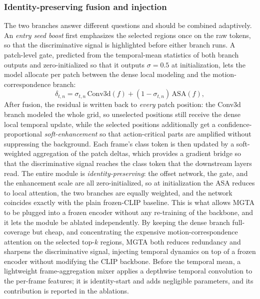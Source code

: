 \subsubsection{Identity-preserving fusion and injection}
The two branches answer different questions and should be combined adaptively. An \emph{entry seed boost} first emphasizes the selected regions once on the raw tokens, so that the discriminative signal is highlighted before either branch runs. A patch-level gate, predicted from the temporal-mean statistics of both branch outputs and zero-initialized so that it outputs $\sigma = 0.5$ at initialization, lets the model allocate per patch between the dense local modeling and the motion-correspondence branch:
\begin{equation}
  \delta_{t,n} = \sigma_{t,n} \, \mathrm{Conv3d}(f) + (1 - \sigma_{t,n}) \, \mathrm{ASA}(f),
  \label{eq:sata-fuse}
\end{equation}
After fusion, the residual is written back to \emph{every} patch position: the Conv3d branch modeled the whole grid, so unselected positions still receive the dense local temporal update, while the selected positions additionally get a confidence-proportional \emph{soft-enhancement} so that action-critical parts are amplified without suppressing the background. Each frame's class token is then updated by a soft-weighted aggregation of the patch deltas, which provides a gradient bridge so that the discriminative signal reaches the class token that the downstream layers read.
The entire module is \emph{identity-preserving}: the offset network, the gate, and the enhancement scale are all zero-initialized, so at initialization the ASA reduces to local attention, the two branches are equally weighted, and the network coincides exactly with the plain frozen-CLIP baseline. This is what allows MGTA to be plugged into a frozen encoder without any re-training of the backbone, and it lets the module be ablated independently. By keeping the dense branch full-coverage but cheap, and concentrating the expensive motion-correspondence attention on the selected top-$k$ regions, MGTA both reduces redundancy and sharpens the discriminative signal, injecting temporal dynamics on top of a frozen encoder without modifying the CLIP backbone.
Before the temporal mean, a lightweight frame-aggregation mixer applies a depthwise temporal convolution to the per-frame features; it is identity-start and adds negligible parameters, and its contribution is reported in the ablations.

